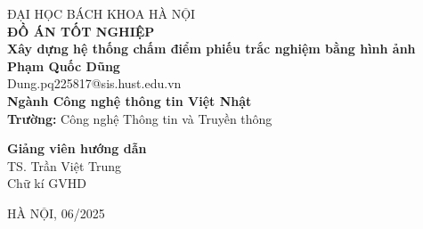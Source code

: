 \begin{titlepage}
    \begin{center}
        {\large ĐẠI HỌC BÁCH KHOA HÀ NỘI} \\
        \vspace{1cm}
        \textbf{\Large ĐỒ ÁN TỐT NGHIỆP} \\
        \vspace{2cm}
        {\LARGE \textbf{Xây dựng hệ thống chấm điểm phiếu trắc nghiệm bằng hình ảnh}} \\
        \vspace{2cm}
        \textbf{\large Phạm Quốc Dũng} \\
        Dung.pq225817@sis.hust.edu.vn \\
        \vspace{1cm}
        \textbf{Ngành Công nghệ thông tin Việt Nhật} \\
        \textbf{Trường:} Công nghệ Thông tin và Truyền thông
    \end{center}

   \vspace{1.5cm}
\begin{flushright}
    \begin{minipage}{6cm}
        \centering
        \textbf{Giảng viên hướng dẫn} \\
        TS. Trần Việt Trung \\
        \vspace{1.2cm}
        Chữ kí GVHD
    \end{minipage}
\end{flushright}

    \vfill
    \begin{center}
        HÀ NỘI, 06/2025
    \end{center}
\end{titlepage}


%

